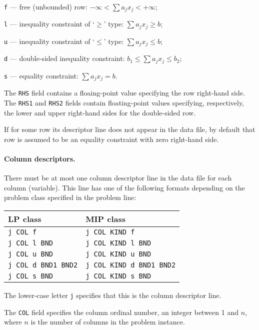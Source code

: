 \verb|f| --- free (unbounded) row: $-\infty<\sum a_jx_j<+\infty$;

\verb|l| --- inequality constraint of `$\geq$' type:
$\sum a_jx_j\geq b$;

\verb|u| --- inequality constraint of `$\leq$' type:
$\sum a_jx_j\leq b$;

\verb|d| --- double-sided inequality constraint:
$b_1\leq\sum a_jx_j\leq b_2$;

\verb|s| --- equality constraint: $\sum a_jx_j=b$.

The \verb|RHS| field contains a floaing-point value specifying the
row right-hand side. The \verb|RHS1| and \verb|RHS2| fields contain
floating-point values specifying, respectively, the lower and upper
right-hand sides for the double-sided row.

If for some row its descriptor line does not appear in the data file,
by default that row is assumed to be an equality constraint with zero
right-hand side.

\paragraph{Column descriptors.} There must be at most one column
descriptor line in the data file for each column (variable). This line
has one of the following formats depending on the problem class
specified in the problem line:

\bigskip

\begin{tabular}{@{}l@{\hspace*{40pt}}l}
LP class & MIP class \\
\hline
\verb|j COL f|           & \verb|j COL KIND f|           \\
\verb|j COL l BND|       & \verb|j COL KIND l BND|       \\
\verb|j COL u BND|       & \verb|j COL KIND u BND|       \\
\verb|j COL d BND1 BND2| & \verb|j COL KIND d BND1 BND2| \\
\verb|j COL s BND|       & \verb|j COL KIND s BND|       \\
\end{tabular}

\bigskip

The lower-case letter \verb|j| specifies that this is the column
descriptor line.

The \verb|COL| field specifies the column ordinal number, an integer
between 1 and $n$, where $n$ is the number of columns in the problem
instance.

